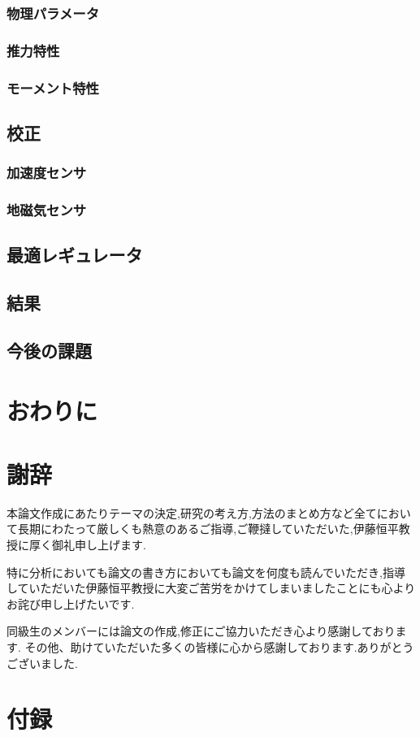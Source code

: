 \documentclass[12pt,oneside]{sotsuken_paper}
\begin{document}
\subsection{物理パラメータ}
\subsection{推力特性}
\subsection{モーメント特性}
\section{校正}
\subsection{加速度センサ}
\subsection{地磁気センサ}
\section{最適レギュレータ}
\section{結果}
\section{今後の課題}

\chapter{おわりに}

\chapter*{謝辞}
本論文作成にあたりテーマの決定,研究の考え方,方法のまとめ方など全てにおいて長期にわたって厳しくも熱意のあるご指導,ご鞭撻していただいた,伊藤恒平教授に厚く御礼申し上げます.


特に分析においても論文の書き方においても論文を何度も読んでいただき,指導していただいた伊藤恒平教授に大変ご苦労をかけてしまいましたことにも心よりお詫び申し上げたいです.


同級生のメンバーには論文の作成,修正にご協力いただき心より感謝しております.
その他、助けていただいた多くの皆様に心から感謝しております.ありがとうございました.

\chapter*{付録}
\end{document}
